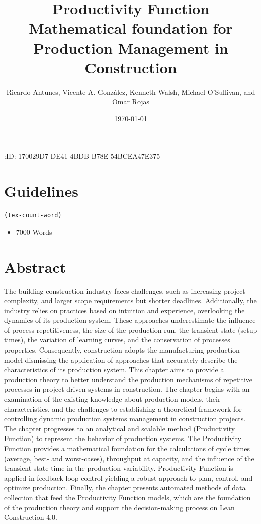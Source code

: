 \documentclass{article}
\author{Ricardo Antunes, Vicente A. González, Kenneth Walsh, Michael O'Sullivan, and Omar Rojas}
\date{\today}
\title{Productivity Function\\\medskip
\large Mathematical foundation for Production Management in Construction}
\begin{document}
\maketitle
\tableofcontents

:ID:       170029D7-DE41-4BDB-B78E-54BCEA47E375


\section{Guidelines}
\label{sec:orge63547b}
\begin{verbatim}
(tex-count-word)
\end{verbatim}
\begin{itemize}
\item 7000 Words
\end{itemize}

\section{Abstract}
\label{sec:orgee81c1d}
The building construction industry faces challenges, such as increasing project complexity, and larger scope requirements but shorter deadlines. 
Additionally, the industry relies on practices based on intuition and experience, overlooking the dynamics of its production system. 
These approaches underestimate the influence of process repetitiveness, the size of the production run, the transient state (setup times), the variation of learning curves, and the conservation of processes properties. 
Consequently, construction adopts the manufacturing production model dismissing the application of approaches that accurately describe the characteristics of its production system. 
This chapter aims to provide a production theory to better understand the production mechanisms of repetitive processes in project-driven systems in construction.
The chapter begins with an examination of the existing knowledge about production models, their characteristics, and the challenges to establishing a theoretical framework for controlling dynamic production systems management in construction projects. 
The chapter progresses to an analytical and scalable method (Productivity Function) to represent the behavior of production systems. 
The Productivity Function provides a mathematical foundation for the calculations of cycle times (average, best- and worst-cases), throughput at capacity, and the influence of the transient state time in the production variability. 
Productivity Function is applied in feedback loop control yielding a robust approach to plan, control, and optimize production.
Finally, the chapter presents automated methods of data collection that feed the Productivity Function models, which are the foundation of the production theory and support the decision-making process on Lean Construction 4.0. 
\end{document}
